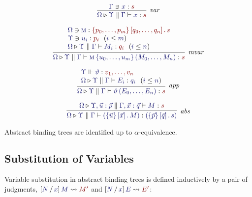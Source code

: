 \documentclass[11pt]{article}
\theoremstyle{definition}
\theoremstyle{remark}
\numberwithin{equation}{section}
\def\IModeColorName{MidnightBlue}
\def\OModeColorName{Maroon}
\newcommand\IMode[1]{{\color{\IModeColorName}{#1}}}
\newcommand\OMode[1]{{\color{\OModeColorName}{#1}}}
\newcommand\HypJ[2]{#1\ \ (#2)}
\newcommand\MkValence[3]{\left\{#1\right\}\left[#2\right].\, #3}
\newcommand\MkBTm[3]{\left\{#1\right\}\left[#2\right].\, #3}
\newcommand\Leq[2]{\IMode{#1}\leq\IMode{#2}}
\newcommand\IsOperator[3]{\IMode{#1}\Vdash \IMode{#2} : \OMode{#3}}
\newcommand\Lookup[3]{\IMode{#1}\ni\IMode{#2}:\OMode{#3}}
\newcommand\IsAbt[5]{%
  \IMode{#1}\triangleright%
  \IMode{#2}\parallel%
  \IMode{#3}\vdash%
  \IMode{#4}:\OMode{#5}%
}
\newcommand\IsBTm[5]{%
  \IMode{#1}\triangleright%
  \IMode{#2}\parallel%
  \IMode{#3}\vdash%
  \IMode{#4}:\IMode{#5}%
}
\newcommand\MV[1]{\textsc{#1}}
\newcommand\MApp[3]{#1\left\{#2\right\}\left(#3\right)}
\newcommand\App[2]{#1\left(#2\right)}
\newcommand\Subst[3]{
  \left[#1\, /\, #2\right]#3%
}
\newcommand\IsSubst[4]{%
  \Subst{\IMode{#1}}{\IMode{#2}}{\IMode{#3}}%
  \leadsto\OMode{#4}%
}
\begin{document}
\begin{gather*}
  \infer[\textit{var}]{
    \IsAbt{\Omega}{\Upsilon}{\Gamma}{x}{s}
  }{
    \Lookup{\Gamma}{x}{s}
  }\\[6pt]
  \infer[\textit{mvar}]{
    \IsAbt{\Omega}{\Upsilon}{\Gamma}{
      \MApp{\MV{m}}{u_0,\dots,u_m}{M_0,\dots,M_n}
    }{s}
  }{
    \begin{array}{l}
      \Lookup{\Omega}{\MV{m}}{\MkValence{p_0,\dots,p_m}{q_0,\dots,q_n}{s}}\\
      \HypJ{\Lookup{\Upsilon}{u_i}{p_i}}{\Leq{i}{m}}\\
      \HypJ{
        \IsAbt{\Omega}{\Upsilon}{\Gamma}{M_i}{q_i}
      }{
        \Leq{i}{n}
      }
    \end{array}
  }\\[6pt]
  \infer[\textit{app}]{
    \IsAbt{\Omega}{\Upsilon}{\Gamma}{
      \App{\vartheta}{E_0,\dots,E_n}
    }{s}
  }{
    \begin{array}{l}
      \IsOperator{\Upsilon}{\vartheta}{
        v_1,\dots,v_n
      }\\
      \HypJ{
        \IsBTm{\Omega}{\Upsilon}{\Gamma}{E_i}{q_i}
      }{
        \Leq{i}{n}
      }
    \end{array}
  }\\[6pt]
  \infer[\textit{abs}]{
    \IsBTm{\Omega}{\Upsilon}{\Gamma}{
      \left(\MkBTm{\vec{u}}{\vec{x}}{M}\right)
    }{
      \left(\MkValence{\vec{p}}{\vec{q}}{s}\right)
    }
  }{
    \IsAbt{\Omega}{\Upsilon, \vec{u}:\vec{p}}{\Gamma,\vec{x}:{\vec{q}}}{
      M
    }{
      s
    }
  }
\end{gather*}

Abstract binding trees are identified up to $\alpha$-equivalence.

\subsection{Substitution of Variables}

Variable substitution in abstract binding trees is defined inductively by a
pair of judgments, $\IsSubst{N}{x}{M}{M'}$ and $\IsSubst{N}{x}{E}{E'}$:
\end{document}

